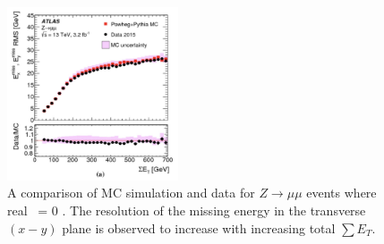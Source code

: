 \begin{figure}[h]
        \centering
	\includegraphics[width=0.45\textwidth]{figures/ch5/met_res}
	\caption{ A comparison of MC simulation and data for $Z\rightarrow\mu\mu$ events where real \met~= 0 \cite{met_res}. The resolution of the missing energy in the transverse $(x-y)$ plane is observed to increase with increasing total $\sum E_T$. }
	\label{fig:met_res}
\end{figure}
